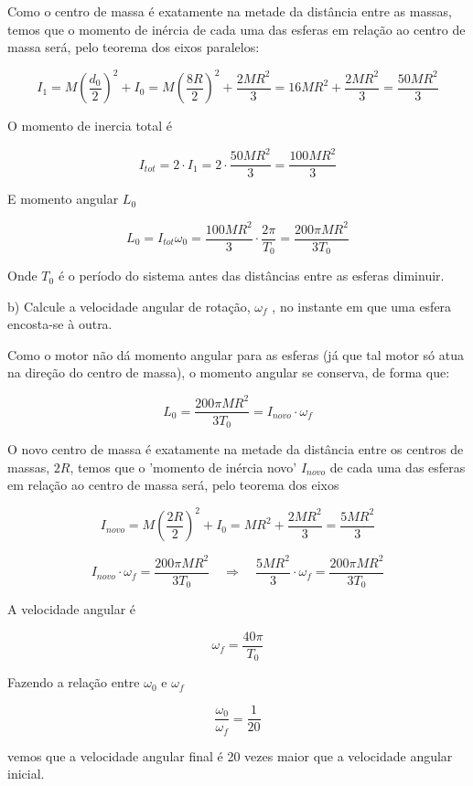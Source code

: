 \begin{enumerate}[start=1,label={\bfseries Q\arabic*.}]
\resposta Como o centro de massa é exatamente na metade da distância entre as massas, temos que o momento de inércia de cada uma das esferas em relação ao centro de massa será, pelo teorema dos eixos paralelos:

$$
I_{1} = M \left( \frac{d_{0}}{2} \right)^{2} + I_{0} =  M \left(\frac{8R}{2} \right)^{2} + \frac{2MR^{2}}{3} = 16 MR^{2} + \frac{2MR^{2}}{3} = \frac{50MR^{2}}{3}
$$

O momento de inercia total é

$$
 I_{tot} = 2 \cdot I_{1} = 2 \cdot \frac{50MR^{2}}{3} = \frac{100MR^{2}}{3}
$$

E momento angular $L_{0}$

$$
L_{0} = I_{tot} \omega_{0} = \frac{100MR^{2}}{3} \cdot \frac{2\pi}{T_{0}} = \frac{200 \pi MR^{2}}{3T_{0}}
$$

Onde $T_{0}$ é o período do sistema antes das distâncias entre as esferas diminuir.





b) Calcule a velocidade angular de rotação, $\omega_{f}$ , no instante em que uma esfera encosta-se à outra.

\resposta Como o motor não dá momento angular para as esferas (já que tal motor só atua na direção do centro de massa), o momento angular se conserva, de forma que:

$$
L_{0} = \frac{200 \pi MR^{2}}{3T_{0}} = I_{novo} \cdot \omega_{f}
$$

O novo centro de massa é exatamente na metade da distância entre os centros de massas, $2R$, temos que o 'momento de inércia novo' $I_{novo}$ de cada uma das esferas em relação ao centro de massa será, pelo teorema dos eixos 

$$
  I_{novo} =  M \left( \frac{2R}{2} \right)^{2} + I_{0}  =  MR^{2} + \frac{2MR^{2}}{3} = \frac{5MR^{2}}{3}
$$



$$
 I_{novo} \cdot \omega_{f} = \frac{200 \pi MR^{2}}{3T_{0}} \quad \Rightarrow \quad  \frac{5MR^{2}}{3} \cdot \omega_{f} = \frac{200 \pi MR^{2}}{3T_{0}}
$$

A velocidade angular é

$$
 \omega_{f} = \frac{40 \pi}{T_{0}}
$$


Fazendo a relação entre $\omega_{0}$ e $\omega_{f}$ 

$$
 \frac{\omega_{0}}{\omega_{f}} = \frac{1}{20}
$$

vemos que a velocidade angular final é 20 vezes maior que a velocidade angular inicial.





\end{enumerate}
